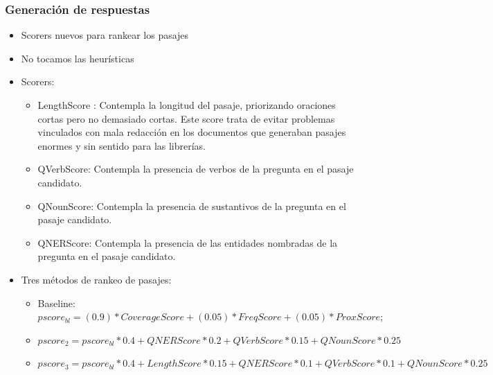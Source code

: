 \begin{frame}
\frametitle{Generación de respuestas}
\ChangeItemFont{\scriptsize}{\scriptsize}{\scriptsize}
  \begin{itemize}
    \item Scorers nuevos para rankear los pasajes
    \item No tocamos las heurísticas
    \item Scorers:
    \begin{itemize}
      \item LengthScore : Contempla la longitud del pasaje, priorizando oraciones cortas pero no demasiado cortas. Este score trata de evitar problemas vinculados con mala redacción en los documentos que generaban pasajes enormes y sin sentido para las librerías.
      \item QVerbScore: Contempla la presencia de verbos de la pregunta en el pasaje candidato.
      \item QNounScore: Contempla la presencia de sustantivos de la pregunta en el pasaje candidato.
      \item QNERScore: Contempla la presencia de las entidades nombradas de la pregunta en el pasaje candidato.
      \end{itemize}
      \item Tres métodos de rankeo de pasajes:
        \begin{itemize}
        \item Baseline: $pscore_{bl} = (0.9)*CoverageScore + (0.05)*FreqScore+ (0.05)*ProxScore;$
        \item $pscore_2 =  pscore_{bl} * 0.4 + QNERScore * 0.2 + QVerbScore*0.15  + QNounScore * 0.25 $
        \item $pscore_3 =  pscore_{bl} * 0.4 + LengthScore * 0.15 + QNERScore * 0.1 + QVerbScore*0.1  + QNounScore * 0.25 $
        \end{itemize}
  \end{itemize}
\end{frame}



